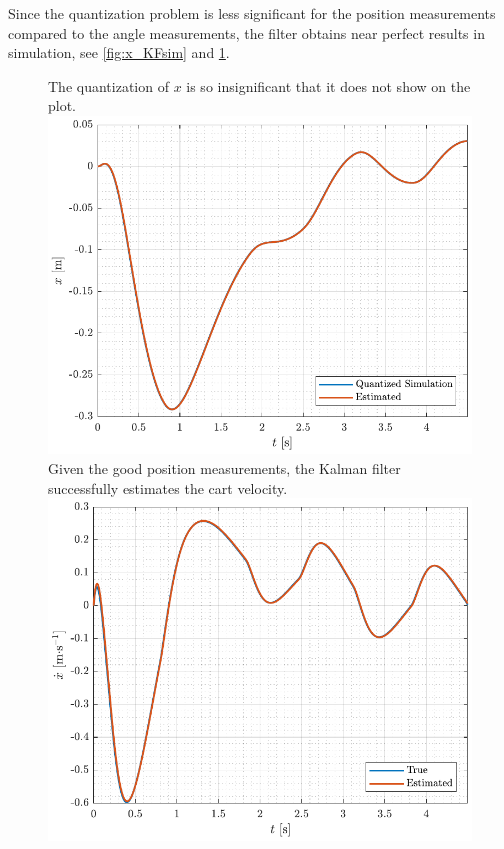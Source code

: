 %
Since the quantization problem is less significant for the position measurements compared to the angle measurements, the filter obtains near perfect results in simulation, see \autoref{fig:x_KFsim} and \ref{fig:xDot_KFsim}.
%
\begin{figure}[H]
  \hspace{-10pt}
  \captionbox
  {
    The quantization of $x$ is so insignificant that it does not show on the plot.
    \label{fig:x_KFsim}
  }
  {
    \hspace{-1cm}
    \includegraphics[width=.5\textwidth]{figures/x_KFsim}
  }
  \hspace{20pt}
  \captionbox 
  {
    Given the good position measurements, the Kalman filter successfully estimates the cart velocity.
    \label{fig:xDot_KFsim}
  }
  {
    \hspace{-1cm}
    \includegraphics[width=.5\textwidth]{figures/xDot_KFsim}
  }  
\end{figure}
%
%


















